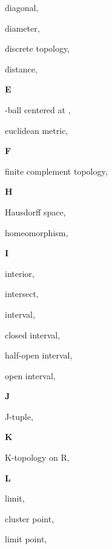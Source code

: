 \begin{multicols}{2}
diagonal, \pageref{def:Diagonal}

diameter, \pageref{def:Diameter}

discrete topology, \pageref{def:DiscreteTopology}

distance, \pageref{def:Distance}

\vspace{1em}\noindent\large{\textbf{E}}

\mt{\epsilon}-ball centered at , \pageref{def:EpsilonBallCenteredAtX}

euclidean metric, \pageref{def:EuclideanMetric}

\vspace{1em}\noindent\large{\textbf{F}}

finite complement topology, \pageref{def:FiniteComplementTopology}

\vspace{1em}\noindent\large{\textbf{H}}

Hausdorff space, \pageref{def:HausdorffSpace}

homeomorphism, \pageref{def:Homeomorphism}

\vspace{1em}\noindent\large{\textbf{I}}

interior, \pageref{def:Interior}

intersect, \pageref{def:Intersect}

interval, \pageref{def:Interval}

\hspace{1em}closed interval, \pageref{def:Interval}

\hspace{1em}half-open interval, \pageref{def:Interval}

\hspace{1em}open interval, \pageref{def:Interval}

\vspace{1em}\noindent\large{\textbf{J}}

J-tuple, \pageref{def:JTuple}

\vspace{1em}\noindent\large{\textbf{K}}

K-topology on R, \pageref{def:KTopologyOnTheRealLine}

\vspace{1em}\noindent\large{\textbf{L}}

limit, \pageref{def:Limit}

cluster point, \pageref{def:LimitPoint}

limit point, \pageref{def:LimitPoint}


\end{multicols}
